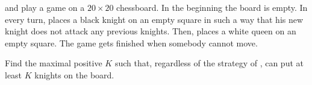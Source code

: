 and  play a game on a $20 \times 20$ chessboard. In the beginning the board is empty. In every turn,  places a black knight on an empty square in such a way that his new knight does not attack any previous knights. Then,  places a white queen on an empty square. The game gets finished when somebody cannot move.

Find the maximal positive $K$ such that, regardless of the strategy of ,  can put at least $K$ knights on the board.